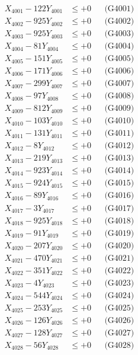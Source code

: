 \documentclass[a4paper,10pt]{article}
\begin{document}
{\begin{align}
\allowbreak
X_{4001} - 122Y_{4001} &\leq +0 && \text{(G4001)} \\
X_{4002} - 925Y_{4002} &\leq +0 && \text{(G4002)} \\
X_{4003} - 925Y_{4003} &\leq +0 && \text{(G4003)} \\
X_{4004} - 81Y_{4004} &\leq +0 && \text{(G4004)} \\
X_{4005} - 151Y_{4005} &\leq +0 && \text{(G4005)} \\
X_{4006} - 171Y_{4006} &\leq +0 && \text{(G4006)} \\
X_{4007} - 299Y_{4007} &\leq +0 && \text{(G4007)} \\
X_{4008} - 97Y_{4008} &\leq +0 && \text{(G4008)} \\
X_{4009} - 812Y_{4009} &\leq +0 && \text{(G4009)} \\
X_{4010} - 103Y_{4010} &\leq +0 && \text{(G4010)} \\
\allowbreak
X_{4011} - 131Y_{4011} &\leq +0 && \text{(G4011)} \\
X_{4012} - 8Y_{4012} &\leq +0 && \text{(G4012)} \\
X_{4013} - 219Y_{4013} &\leq +0 && \text{(G4013)} \\
X_{4014} - 923Y_{4014} &\leq +0 && \text{(G4014)} \\
X_{4015} - 924Y_{4015} &\leq +0 && \text{(G4015)} \\
X_{4016} - 89Y_{4016} &\leq +0 && \text{(G4016)} \\
X_{4017} - 3Y_{4017} &\leq +0 && \text{(G4017)} \\
X_{4018} - 925Y_{4018} &\leq +0 && \text{(G4018)} \\
X_{4019} - 91Y_{4019} &\leq +0 && \text{(G4019)} \\
X_{4020} - 207Y_{4020} &\leq +0 && \text{(G4020)} \\
\allowbreak
X_{4021} - 470Y_{4021} &\leq +0 && \text{(G4021)} \\
X_{4022} - 351Y_{4022} &\leq +0 && \text{(G4022)} \\
X_{4023} - 4Y_{4023} &\leq +0 && \text{(G4023)} \\
X_{4024} - 544Y_{4024} &\leq +0 && \text{(G4024)} \\
X_{4025} - 253Y_{4025} &\leq +0 && \text{(G4025)} \\
X_{4026} - 126Y_{4026} &\leq +0 && \text{(G4026)} \\
X_{4027} - 128Y_{4027} &\leq +0 && \text{(G4027)} \\
X_{4028} - 56Y_{4028} &\leq +0 && \text{(G4028)} \\

\end{align}}
\end{document}
